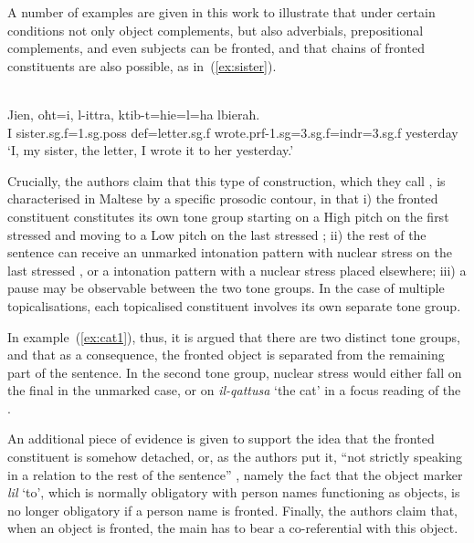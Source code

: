 \documentclass[output=paper]{LSP/langsci}
\begin{document}

A number of examples are given in this work to illustrate that under
certain conditions not only object complements, but also adverbials,
prepositional complements, and even subjects can be fronted, and that
chains of fronted constituents are also possible, as
in~(\ref{ex:sister}).

\ea\label{ex:sister}
{\citealt[76]{BorgAlexander2009}}\\
\gll Jien, oħt=i, l-ittra, ktib-t=hie=l=ha lbieraħ.\\
     I sister.{\sc sg.f}=1.{\sc sg.poss} {\sc def}=letter.{\sc sg.f} wrote.{\sc prf}-1.{\sc sg}=3.{\sc sg.f}={\sc indr}=3.{\sc sg.f} yesterday\\
\glt `I, my sister, the letter, I wrote it to her yesterday.'
\z

Crucially, the authors claim that this type of construction, which
they call , is characterised in Maltese by a specific
prosodic contour, in that i) the fronted constituent constitutes
its own tone group starting on a High pitch on the first stressed
 and moving to a Low pitch on the last stressed ; ii)
the rest of the sentence can receive an unmarked intonation pattern
with nuclear stress on the last stressed , or a 
intonation pattern with a nuclear stress placed elsewhere; iii) a
pause may be observable between the two tone groups. In the case of
multiple topicalisations, each topicalised constituent involves its own 
separate tone group.

In example~(\ref{ex:cat1}), thus, it is argued that there are two
distinct tone groups, and that as a consequence, the fronted
object is separated from the remaining part of the sentence. In the
second tone group, nuclear stress would either fall on the final 
in the unmarked case, or on {\em il-qattusa} `the cat' in a
 focus reading of the .

An additional piece of evidence is given to support the idea that the
fronted constituent is somehow detached, or, as the authors put
it, ``not strictly speaking in a  relation to the rest
  of the sentence'' \citep[73]{BorgAlexander2009}, namely the fact that
the object marker {\em lil} `to', which is normally obligatory with
person names functioning as objects, is no longer obligatory if a
person name is fronted. Finally, the authors claim that, when an
object is fronted, the main  has to bear a  
co-referential with this object. 
\end{document}
